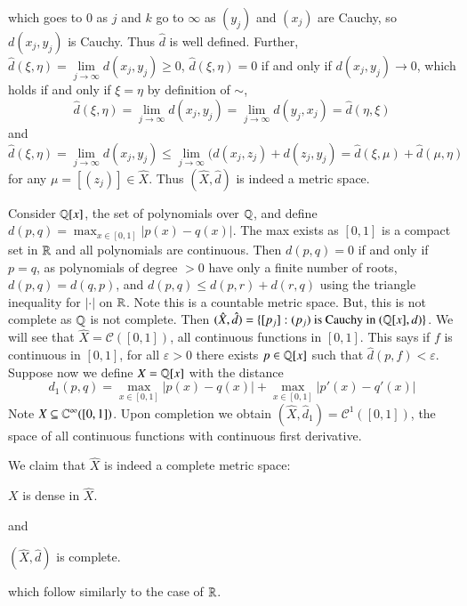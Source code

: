 which goes to $0$ as $j$ and $k$ go to $\infty$ as $(y_j)$ and $(x_j)$ are Cauchy, so $d(x_j,y_j)$ is Cauchy. Thus $\hat{d}$ is well defined. Further, $\hat{d}(\xi,\eta) = \lim\limits_{j\rightarrow \infty}d(x_j,y_j) \geq 0$, $\hat{d}(\xi,\eta) = 0$ if and only if $d(x_j,y_j)\rightarrow 0$, which holds if and only if $\xi = \eta$ by definition of $\sim$, $$\hat{d}(\xi,\eta) = \lim\limits_{j\rightarrow \infty}d(x_j,y_j) = \lim\limits_{j\rightarrow \infty}d(y_j,x_j) = \hat{d}(\eta,\xi)$$
and \begin{equation*}
    \hat{d}(\xi,\eta) = \lim\limits_{j\rightarrow \infty}d(x_j,y_j) \leq \lim\limits_{j\rightarrow \infty}(d(x_j,z_j) + d(z_j,y_j) = \hat{d}(\xi,\mu) + \hat{d}(\mu,\eta)
\end{equation*}
for any $\mu = [(z_j)] \in \hat{X}$. Thus $(\hat{X},\hat{d})$ is indeed a metric space.

\begin{eg}
    Consider $\mathbb Q[x]$, the set of polynomials over $\mathbb Q$, and define $d(p,q) = \max_{x \in [0,1]}|p(x) - q(x)|$. The max exists as $[0,1]$ is a compact set in $\mathbb R$ and all polynomials are continuous. Then $d(p,q) = 0$ if and only if $p = q$, as polynomials of degree $> 0$ have only a finite number of roots, $d(p,q) = d(q,p)$, and $d(p,q) \leq d(p,r) + d(r,q)$ using the triangle inequality for $|\cdot|$ on $\mathbb R$. Note this is a countable metric space. But, this is not complete as $\mathbb Q$ is not complete. Then $(\hat{X},\hat{d}) = \{[p_j]:(p_j)\text{ is Cauchy in }(\mathbb Q[x],d)\}$. We will see that $\hat{X} = \mathcal{C}([0,1])$, all continuous functions in $[0,1]$. This says if $f$ is continuous in $[0,1]$, for all $\varepsilon > 0$ there exists $p \in \mathbb Q[x]$ such that $\hat{d}(p,f) < \varepsilon$. Suppose now we define $X = \mathbb Q[x]$ with the distance \begin{equation*}
        d_1(p,q) = \max_{x \in [0,1]}|p(x) - q(x)| + \max_{x \in [0,1]}|p'(x) - q'(x)|
    \end{equation*}
    Note $X \subseteq \mathbb C^{\infty}([0,1])$. Upon completion we obtain $(\hat{X},\hat{d}_1) = \mathcal{C}^1([0,1])$, the space of all continuous functions with continuous first derivative.
\end{eg}

We claim that $\hat{X}$ is indeed a complete metric space:

\begin{lem}
    $X$ is dense in $\hat{X}$.
\end{lem}
and 
\begin{prop}
    $(\hat{X},\hat{d})$ is complete.
\end{prop}
which follow similarly to the case of $\mathbb R$.



